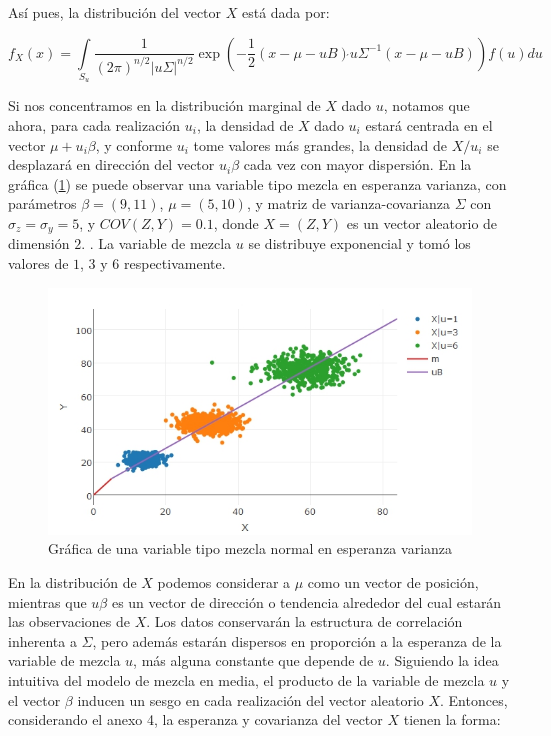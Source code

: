Así pues, la distribución del vector $X$ está dada por:

\begin{equation*}
f_{X}(x)=\underset{S_{u}}{\int}\dfrac{1}{(2\pi)^{n/2}|u\Sigma|^{n/2}}\exp(-\dfrac{1}{2}(x-\mu-uB)\acute{}u\Sigma^{-1}(x-\mu-uB))f(u)du 
\end{equation*}

Si nos concentramos en la distribución marginal de $X$ dado $u$, notamos que ahora, para cada realización  $u_{i}$, la densidad de $X$ dado $u_{i}$ estará centrada en el vector $\mu + u_{i}\beta$, y conforme $u_{i}$ tome valores más grandes, la densidad de $X/u_{i}$ se desplazará en dirección del vector $u_{i}\beta$ cada vez con mayor dispersión. 
En la gráfica (\ref{fig:dmnev}) se puede observar una variable tipo mezcla en esperanza varianza, con parámetros $\beta=(9,11)$, $\mu=(5,10)$, y matriz de varianza-covarianza $\Sigma$
con $\sigma_{z}=\sigma_{y}=5$, y $COV(Z,Y)=0$.$1$, donde $X=(Z,Y)$ es un vector aleatorio de dimensión $2$.
. La variable de mezcla $u$ se distribuye exponencial y tomó los valores de $1$, $3$ y $6$ respectivamente.

\begin{figure}[h]
	\centering
	\includegraphics[width=1\linewidth]{Figuras/bm}
	\caption{Gráfica de una variable tipo mezcla normal en esperanza varianza}
	\label{fig:dmnev}
\end{figure}


\pagebreak
En la distribución de $X$ podemos considerar a $\mu$ como un vector de posición, mientras que $u\beta$ es un vector de dirección o tendencia alrededor del cual estarán las observaciones de $X$. Los datos conservarán la estructura de correlación inherenta a $\Sigma$, pero además estarán dispersos en proporción a la esperanza de la variable de mezcla $u$, más alguna constante que depende de $u$. Siguiendo la idea intuitiva del modelo de mezcla en media, el producto de la variable de mezcla $u$ y el vector $\beta$ inducen un sesgo en cada realización del vector aleatorio $X$. Entonces, considerando el anexo 4,  la esperanza y covarianza del vector $X$ tienen la forma:

